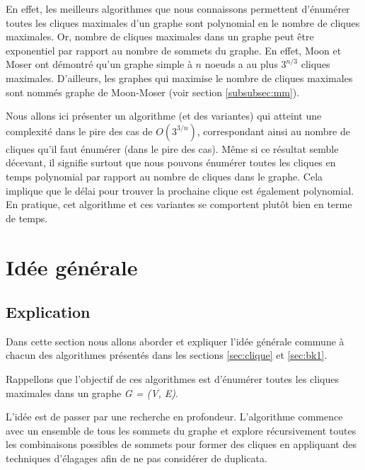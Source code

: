 \documentclass[12pt,a4paper]{article}
\begin{document}
En effet, les meilleurs algorithmes que nous connaissons permettent d'énumérer toutes les cliques maximales d'un graphe sont polynomial en le nombre de cliques maximales. Or, nombre de cliques maximales dans un graphe peut être exponentiel par rapport au nombre de sommets du graphe. En effet, Moon et Moser ont démontré qu'un graphe simple à \(n\) noeuds a au plus \( 3^{n/3} \) cliques maximales\cite{MR0182577}. D'ailleurs, les graphes qui maximise le nombre de cliques maximales sont nommés graphe de Moon-Moser (voir section \ref{subsubsec:mm}).

Nous allons ici présenter un algorithme (et des variantes) qui atteint une complexité dans le pire des cas de \(O(3^{3/n})\)\cite{CONTE20221}, correspondant ainsi au nombre de cliques qu'il faut énumérer (dans le pire des cas). Même si ce résultat semble décevant, il signifie surtout que nous pouvons énumérer toutes les cliques en temps polynomial par rapport au nombre de cliques dans le graphe. Cela implique que le délai pour trouver la prochaine clique est également polynomial. En pratique, cet algorithme et ces variantes se comportent plutôt bien en terme de temps.

\section{Idée générale}%
\label{sec:idee}

\subsection{Explication}%
\label{subsec:explication}

Dans cette section nous allons aborder et expliquer l'idée générale commune à chacun des algorithmes présentés dans les sections \ref{sec:clique} et \ref{sec:bk1}.

Rappellons que l'objectif de ces algorithmes est d'énumérer toutes les cliques maximales dans un graphe \emph{G = (V, E)}.

L'idée est de passer par une recherche en profondeur. L'algorithme commence avec un ensemble de tous les sommets du graphe et explore récursivement toutes les combinaisons possibles de sommets pour former des cliques en appliquant des techniques d'élagages afin de ne pas considérer de duplicata.
\end{document}
